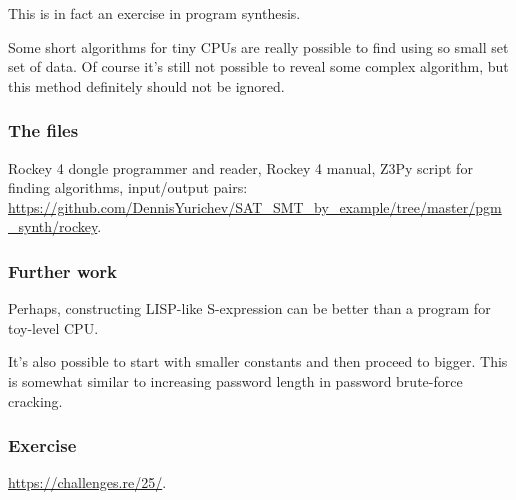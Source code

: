 This is in fact an exercise in program synthesis.

Some short algorithms for tiny \ac{CPU}s are really possible to find using so small set set of data.
Of course it's still not possible to reveal some complex algorithm,
but this method definitely should not be ignored.

\subsubsection{The files}

Rockey 4 dongle programmer and reader, Rockey 4 manual, Z3Py script for finding algorithms, input/output pairs:
\url{https://github.com/DennisYurichev/SAT_SMT_by_example/tree/master/pgm_synth/rockey}.

\subsubsection{Further work}

Perhaps, constructing LISP-like S-expression can be better than a program for toy-level CPU.

It's also possible to start with smaller constants and then proceed to bigger.
This is somewhat similar to increasing password length in password brute-force cracking.

\subsubsection{Exercise}

\url{https://challenges.re/25/}.

